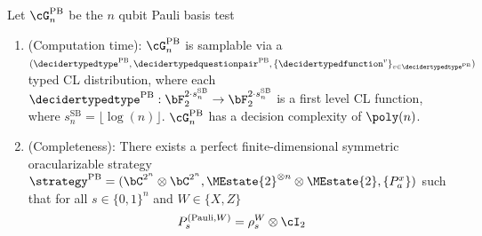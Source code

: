 \begin{theorem} \label{thm:completenessPaulibasis}
	Let $\cG^{\text{PB}}_n$ be the $n$ qubit Pauli basis test
	\begin{enumerate}
		\item (Computation time): $\cG^{\text{PB}}_n$ is samplable via a $(\decidertypedtype^{\text{PB}}, \decidertypedquestionpair^{\text{PB}}, \{\decidertypedfunction^{v}\}_{v \in \decidertypedtype^{\text{PB}}} )$ typed CL distribution, where each $\decidertypedtype^{\text{PB}}: \bF_2^{2 \cdot s^{\text{SB}}_n} \rightarrow  \bF_2^{2 \cdot s^{\text{SB}}_n}$ is a first level CL function, where $s^{\text{SB}}_n = \lfloor \log(n) \rfloor$.  $\cG^{\text{PB}}_n$ has a decision complexity of $\poly(n)$. 
		\item (Completeness): There exists a perfect finite-dimensional symmetric oracularizable strategy $\strategy^{\text{PB}} = (\bC^{2^n} \otimes \bC^{2^n}, \MEstate{2}^{\otimes n} \otimes \MEstate{2}, \{P_a^x \})$ such that for all $s \in \{0,1\}^n$ and $W \in \{X,Z\}$
		\begin{equation*}
			 P_{s}^{(\text{Pauli}, W)} =  \rho^W_{s} \otimes \cI_2
		\end{equation*}
	\end{enumerate}
\end{theorem}

